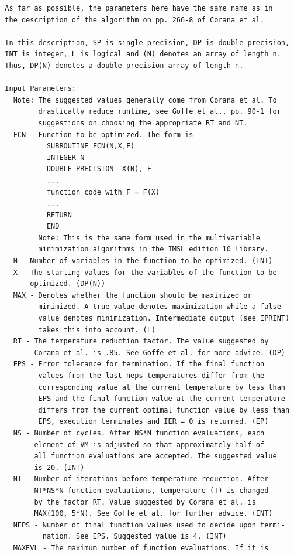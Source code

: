 \documentclass[11pt,twoside]{article}
\begin{document}
\begin{verbatim}
  As far as possible, the parameters here have the same name as in
  the description of the algorithm on pp. 266-8 of Corana et al.

  In this description, SP is single precision, DP is double precision,
  INT is integer, L is logical and (N) denotes an array of length n.
  Thus, DP(N) denotes a double precision array of length n.

  Input Parameters:
    Note: The suggested values generally come from Corana et al. To
          drastically reduce runtime, see Goffe et al., pp. 90-1 for
          suggestions on choosing the appropriate RT and NT.
    FCN - Function to be optimized. The form is
            SUBROUTINE FCN(N,X,F)
            INTEGER N
            DOUBLE PRECISION  X(N), F
            ...
            function code with F = F(X)
            ...
            RETURN
            END
          Note: This is the same form used in the multivariable
          minimization algorithms in the IMSL edition 10 library.
    N - Number of variables in the function to be optimized. (INT)
    X - The starting values for the variables of the function to be
        optimized. (DP(N))
    MAX - Denotes whether the function should be maximized or
          minimized. A true value denotes maximization while a false
          value denotes minimization. Intermediate output (see IPRINT)
          takes this into account. (L)
    RT - The temperature reduction factor. The value suggested by
         Corana et al. is .85. See Goffe et al. for more advice. (DP)
    EPS - Error tolerance for termination. If the final function
          values from the last neps temperatures differ from the
          corresponding value at the current temperature by less than
          EPS and the final function value at the current temperature
          differs from the current optimal function value by less than
          EPS, execution terminates and IER = 0 is returned. (EP)
    NS - Number of cycles. After NS*N function evaluations, each
         element of VM is adjusted so that approximately half of
         all function evaluations are accepted. The suggested value
         is 20. (INT)
    NT - Number of iterations before temperature reduction. After
         NT*NS*N function evaluations, temperature (T) is changed
         by the factor RT. Value suggested by Corana et al. is
         MAX(100, 5*N). See Goffe et al. for further advice. (INT)
    NEPS - Number of final function values used to decide upon termi-
           nation. See EPS. Suggested value is 4. (INT)
    MAXEVL - The maximum number of function evaluations. If it is

\end{verbatim}
\end{document}
